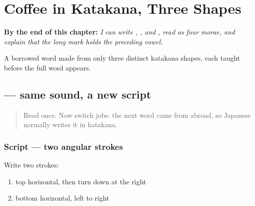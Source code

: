 
\chapter{Coffee in Katakana, Three Shapes}
\label{ch:ja-koohii-katakana}

\begin{chapteropening}
\textbf{By the end of this chapter:} \emph{I can write , , and , read  as four morae, and explain that the long mark holds the preceding vowel.}

A borrowed word made from only three distinct katakana shapes, each taught before the full word appears.
\end{chapteropening}

\section[\texorpdfstring{\ja{コ} (ko)}{コ (ko)}]{ — same sound, a new script}

\label{lesson:JA-W06-ko-katakana}



\begin{quote}
Read  once. Now switch jobs: the next word came from abroad, so Japanese normally writes it in katakana.
\end{quote}

\subsection*{Script — two angular strokes}

\begin{quote}
\end{quote}

Write two strokes:

\begin{enumerate}
\raggedright
  \item top horizontal, then turn down at the right
  \item bottom horizontal, left to right
\end{enumerate}

